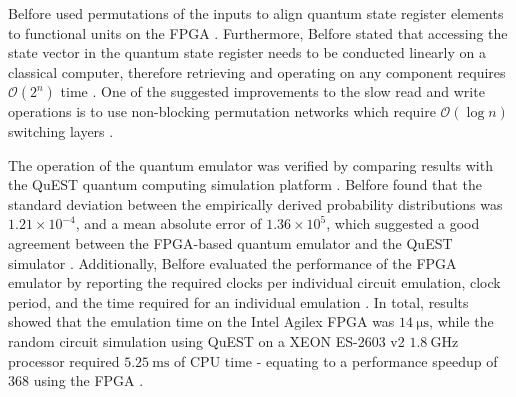 Belfore used permutations of the inputs to align quantum state register elements to functional units on the FPGA \cite{belfore2024scalable}. Furthermore, Belfore stated that accessing the state vector in the quantum state register needs to be conducted linearly on a classical computer, therefore retrieving and operating on any component requires $\mathcal{O}(2^n)$ time \cite{belfore2024scalable}. One of the suggested improvements to the slow read and write operations is to use non-blocking permutation networks which require $\mathcal{O}(\log n)$ switching layers \cite{belfore2024scalable}.

The operation of the quantum emulator was verified by comparing results with the QuEST quantum computing simulation platform \cite{belfore2024scalable}. Belfore found that the standard deviation between the empirically derived probability distributions was $1.21\times10^{-4}$, and a mean absolute error of $1.36\times10^5$, which suggested a good agreement between the FPGA-based quantum emulator and the QuEST simulator \cite{belfore2024scalable}. Additionally, Belfore evaluated the performance of the FPGA emulator by reporting the required clocks per individual circuit emulation, clock period, and the time required for an individual emulation \cite{belfore2024scalable}. In total, results showed that the emulation time on the Intel Agilex FPGA was $\SI{14}{\micro\second}$, while the random circuit simulation using QuEST on a XEON ES-2603 v2 $\SI{1.8}{\giga\hertz}$ processor required $\SI{5.25}{\milli\second}$ of CPU time - equating to a performance speedup of 368 using the FPGA \cite{belfore2024scalable}.

